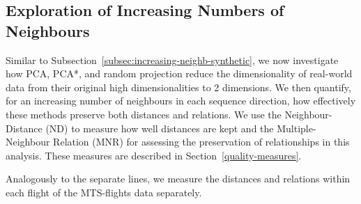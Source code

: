 \documentclass[pdftex,12pt,a4paper]{report}
\begin{document}
\FloatBarrier

\subsection{Exploration of Increasing Numbers of Neighbours} \label{subsec:increasing-neighb-real}


\FloatBarrier
Similar to Subsection~\ref{subsec:increasing-neighb-synthetic}, we now investigate how PCA, PCA*, and random projection reduce the dimensionality of real-world data from their original high dimensionalities to 2 dimensions.
We then quantify, for an increasing number of neighbours in each sequence direction, how effectively these methods preserve both distances and relations.
We use the Neighbour-Distance (ND) to measure how well distances are kept and the Multiple-Neighbour Relation (MNR) for assessing the preservation of relationships in this analysis.
These measures are described in Section~\ref{quality-measures}. 

Analogously to the separate lines, we measure the distances and relations within each flight of the MTS-flights data separately.
\end{document}
